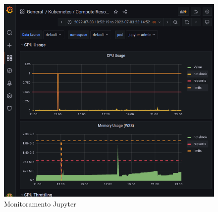 \documentclass[10pt,brazil]{beamer}
\theoremstyle{definition}
\begin{document}


\begin{frame}[plain]
  \hspace*{-10mm}
    \begin{figure}
    \centering  
  \includegraphics[width=.6\paperwidth]{jupyter_consumption.png}
      \caption[Monitoramento Jupyter]{Monitoramento Jupyter}
  \end{figure}  
\end{frame}
\end{document}
